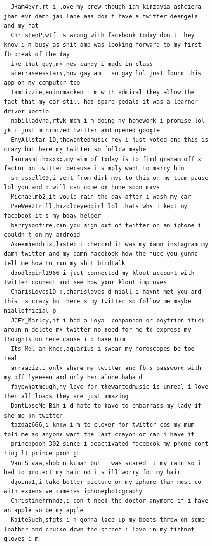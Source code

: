 \begin{figure}[htpb]
\begin{verbatim}
  JHam4evr,rt i love my crew though iam kinzavia ashciera jham evr damn jas lame ass don t have a twitter deangela and my fat
  ChristenP,wtf is wrong with facebook today don t they know i m busy as shit amp was looking forward to my first fb break of the day
  ike_that_guy,my new candy i made in class
  sierraseesstars,how gay am i so gay lol just found this app on my computer too
  IamLizzie,eoincmacken i m with admiral they allow the fact that my car still has spare pedals it was a learner driver beetle
  nabilladvna,rtwk mom i m doing my homework i promise lol jk i just minimized twitter and opened google
  EmyAllstar_1D,thewantedmusic hey i just voted and this is crazy but here my twitter so follow maybe
  laurasmithxxxxx,my aim of today is to find graham off x factor on twitter because i simply want to marry him
  snrussell09,i went from dirk mvp to this on my team pause lol you and d will can come on home soon mavs
  Michaelmb2,it would rain the day after i wash my car
  PeeWee2Trill,hazoldeyedgirl lol thats why i kept my facebook it s my bday helper
  berrysonfire,can you sign out of twitter on an iphone i couldn t on my android
  Akeemhendrix,lasted i checced it was my damn instagram my damn twitter and my damn facebook how the fucc you gunna tell me how to run my shit birdtalk
  doodlegirl1966,i just connected my klout account with twitter connect and see how your klout improves
  CharisLoves1D_x,charisloves d niall i havnt met you and this is crazy but here s my twitter so follow me maybe niallofficial p
  JCEY_Marley,if i had a loyal companion or boyfrien ifuck aroun n delete my twitter no need for me to express my thoughts on here cause i d have him
  Its_Mel_ah_knee,aquarius i swear my horoscopes be too real
  arraaziz,i only share my twitter and fb s password with my bff lyeeeen and only her alone haha d
  fayewhatmough,my love for thewantedmusic is unreal i love them all loads they are just amazing
  DontLoseMe_Bih,i d hate to have to embarrass my lady if she me on twitter
  tazdaz666,i know i m to clever for twitter cos my mum told me so anyone want the last crayon or can i have it
  princepooh_302,since i deactivated facebook my phone dont ring lt prince pooh gt
  VaniSivaa,shobinikumar but i was scared it my rain so i had to protect my hair nd i still worry for my hair
  dgoins1,i take better picture on my iphone than most do with expensive cameras iphonephotography
  Christinefrnndz,i don t need the doctor anymore if i have an apple so be my apple
  KaiteSuch,sfgts i m gonna lace up my boots throw on some leather and cruise down the street i love in my fishnet gloves i m

\end{verbatim}
\end{figure}
